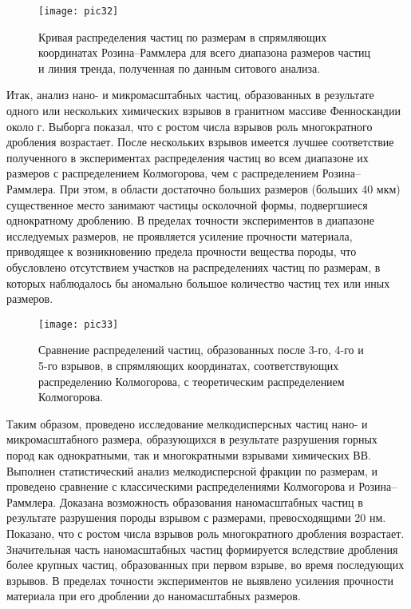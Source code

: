 \begin{figure} [h] 
  \center
  \texttt{[image: pic32]}
  \caption{Кривая распределения частиц по размерам в спрямляющих координатах Розина–Раммлера для всего диапазона размеров частиц и линия тренда, полученная по данным ситового анализа.} 
  \label{img:3rr}  
\end{figure}

Итак, анализ нано- и микромасштабных частиц, образованных в результате одного или нескольких химических взрывов в гранитном массиве Фенноскандии около г. Выборга показал, что с ростом числа взрывов роль многократного дробления возрастает. После нескольких взрывов имеется лучшее соответствие полученного в экспериментах распределения частиц во всем диапазоне их размеров с распределением Колмогорова, чем с распределением Розина–Раммлера. При этом, в области достаточно больших размеров (больших 40 мкм) существенное место занимают частицы осколочной формы, подвергшиеся однократному дроблению. В пределах точности экспериментов в диапазоне исследуемых размеров, не проявляется усиление прочности материала, приводящее к возникновению предела прочности вещества породы, что обусловлено отсутствием участков на распределениях частиц по размерам, в которых наблюдалось бы аномально большое количество частиц тех или иных размеров.

\begin{figure} [h] 
  \center
  \texttt{[image: pic33]}
  \caption{Сравнение распределений частиц, образованных после 3-го, 4-го и 5-го взрывов, в спрямляющих координатах, соответствующих распределению Колмогорова, с теоретическим распределением Колмогорова.} 
  \label{img:3k}  
\end{figure}

Таким образом, проведено исследование мелкодисперсных частиц нано- и микромасштабного размера, образующихся в результате разрушения горных пород как однократными, так и многократными взрывами химических ВВ. Выполнен статистический анализ мелкодисперсной фракции по размерам, и проведено сравнение с классическими распределениями Колмогорова и Розина–Раммлера. Доказана возможность образования наномасштабных частиц в результате разрушения породы взрывом с размерами, превосходящими 20 нм. Показано, что с ростом числа взрывов роль многократного дробления возрастает. Значительная часть наномасштабных частиц формируется вследствие дробления более крупных частиц, образованных при первом взрыве, во время последующих взрывов. В пределах точности экспериментов не выявлено усиления прочности материала при его дроблении до наномасштабных размеров.





\clearpage